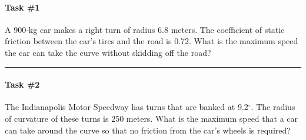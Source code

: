 \documentclass[12pt]{exam}
\begin{document}
\Large


\paragraph{Task \#1}
A 900-kg car makes a right turn of radius 6.8 meters.  The coefficient of static friction between the car's tires and the road is 0.72.  What is the maximum speed the car can take the curve without skidding off the road?

    \vspace{1em}


\vs
\hrule
\vs


\paragraph{Task \#2}
The Indianapolis Motor Speedway has turns that are banked at 9.2$^\circ$.  The radius of curvature of these turns is 250 meters.  What is the maximum speed that a car can take around the curve so that no friction from the car's wheels is required?

\vs


  
\end{document}

